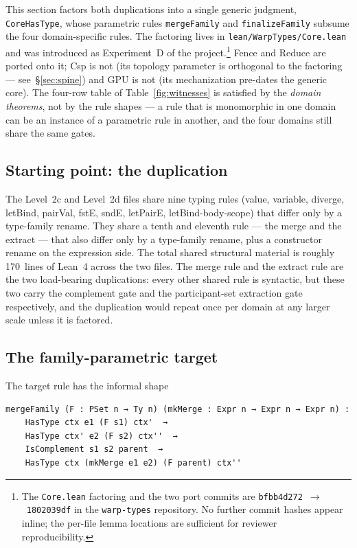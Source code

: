 \documentclass[acmsmall,screen,review,anonymous,nonacm]{acmart}
\newcommand{\CoreHasType}{\texttt{CoreHasType}}
\begin{document}
This section factors both duplications into a single generic judgment, \CoreHasType{}, whose parametric rules \texttt{mergeFamily} and \texttt{finalizeFamily} subsume the four domain-specific rules. The factoring lives in \texttt{lean/WarpTypes/Core.lean} and was introduced as Experiment~D of the project.\footnote{The \texttt{Core.lean} factoring and the two port commits are \texttt{bfbb4d272}~$\to$~\texttt{1802039df} in the \texttt{warp-types} repository. No further commit hashes appear inline; the per-file lemma locations are sufficient for reviewer reproducibility.} Fence and Reduce are ported onto it; Csp is not (its topology parameter is orthogonal to the factoring --- see~\S\ref{sec:spine}) and GPU is not (its mechanization pre-dates the generic core). The four-row table of Table~\ref{fig:witnesses} is satisfied by the \emph{domain theorems}, not by the rule shapes --- a rule that is monomorphic in one domain can be an instance of a parametric rule in another, and the four domains still share the same gates.

\subsection{Starting point: the duplication}\label{sec:starting-point}

The Level~2c and Level~2d files share nine typing rules (value, variable, diverge, letBind, pairVal, fstE, sndE, letPairE, letBind-body-scope) that differ only by a type-family rename. They share a tenth and eleventh rule --- the merge and the extract --- that also differ only by a type-family rename, plus a constructor rename on the expression side. The total shared structural material is roughly 170~lines of Lean~4 across the two files. The merge rule and the extract rule are the two load-bearing duplications: every other shared rule is syntactic, but these two carry the complement gate and the participant-set extraction gate respectively, and the duplication would repeat once per domain at any larger scale unless it is factored.

\subsection{The family-parametric target}\label{sec:family-parametric-target}

The target rule has the informal shape

\begin{lstlisting}
mergeFamily (F : PSet n → Ty n) (mkMerge : Expr n → Expr n → Expr n) :
    HasType ctx e1 (F s1) ctx'  →
    HasType ctx' e2 (F s2) ctx''  →
    IsComplement s1 s2 parent  →
    HasType ctx (mkMerge e1 e2) (F parent) ctx''
\end{lstlisting}
\end{document}
